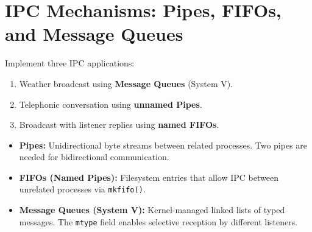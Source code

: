 \documentclass[11pt,a4paper]{article}
\begin{document}
\newpage

\section{IPC Mechanisms: Pipes, FIFOs, and Message Queues}

\begin{questionbox}
Implement three IPC applications:
\begin{enumerate}[nosep]
    \item[(a)] Weather broadcast using \textbf{Message Queues} (System V).
    \item[(b)] Telephonic conversation using \textbf{unnamed Pipes}.
    \item[(c)] Broadcast with listener replies using \textbf{named FIFOs}.
\end{enumerate}
\end{questionbox}

\begin{theorybox}
\begin{itemize}[nosep]
    \item \textbf{Pipes:} Unidirectional byte streams between related processes. Two pipes are needed for bidirectional communication.
    \item \textbf{FIFOs (Named Pipes):} Filesystem entries that allow IPC between unrelated processes via \texttt{mkfifo()}.
    \item \textbf{Message Queues (System V):} Kernel-managed linked lists of typed messages. The \texttt{mtype} field enables selective reception by different listeners.
\end{itemize}
\end{theorybox}
\end{document}
